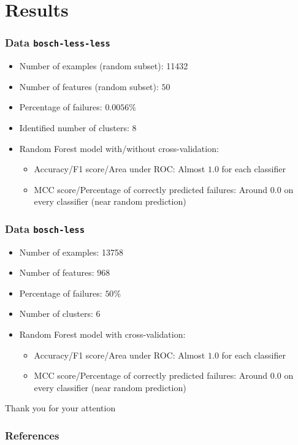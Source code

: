 \documentclass{beamer}
\begin{document}
\section{Results}
\begin{frame}
  \frametitle{Data \texttt{bosch-less-less}}
  \begin{itemize}
    \item Number of examples (random subset): \num{11432}
    \item Number of features (random subset): $50$
    \item Percentage of failures: $0.0056\%$
    \item Identified number of clusters: $8$
    \item Random Forest model with/without cross-validation:
      \begin{itemize}
        \item Accuracy/F1 score/Area under ROC: Almost $1.0$ for each classifier
        \item MCC score/Percentage of correctly predicted failures: Around $0.0$ on every classifier (near random prediction)
      \end{itemize}
  \end{itemize}
\end{frame}

\begin{frame}
  \frametitle{Data \texttt{bosch-less}}
  \begin{itemize}
    \item Number of examples: \num{13758}
    \item Number of features: $968$
    \item Percentage of failures: $50\%$
    \item Number of clusters: $6$
    \item Random Forest model with cross-validation:
      \begin{itemize}
        \item Accuracy/F1 score/Area under ROC: Almost $1.0$ for each classifier
        \item MCC score/Percentage of correctly predicted failures: Around $0.0$ on every classifier (near random prediction)
      \end{itemize}
  \end{itemize}
\end{frame}


\appendix

\begin{frame}[standout]
	Thank you for your attention
\end{frame}

\begin{frame}
	\frametitle{References}
	\nocite{*}
    
    
\end{frame}
\end{document}
